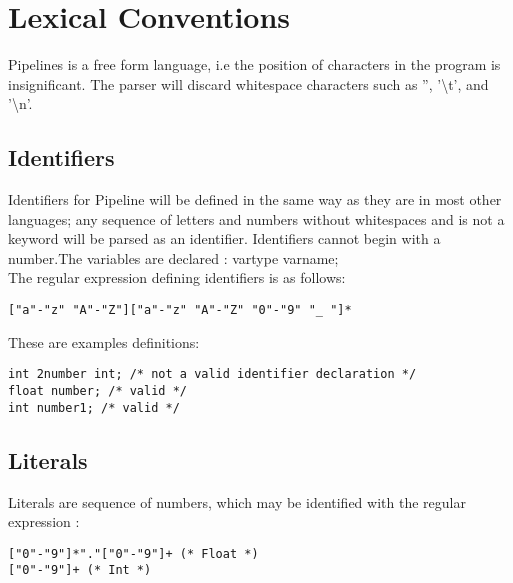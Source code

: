\documentclass[./LRM_main.tex]{subfiles}
\begin{document}


\chapter{Lexical Conventions}

Pipelines is a free form language, i.e the position of characters in the program is insignificant. The parser will discard whitespace characters such as '', '\textbackslash t', and '\textbackslash n'. 

\section{Identifiers}
Identifiers for Pipeline will be defined in the same way as they are in most other languages; any sequence of letters and numbers without whitespaces and is not a keyword will be parsed as an identifier. Identifiers cannot begin with a number.The variables are declared : vartype varname;  \\
The regular expression defining identifiers is as follows:  

\begin{lstlisting}
["a"-"z" "A"-"Z"]["a"-"z" "A"-"Z" "0"-"9" "_ "]*
\end{lstlisting}

These are examples definitions:

\begin{lstlisting}
int 2number int; /* not a valid identifier declaration */ 
float number; /* valid */ 
int number1; /* valid */
\end{lstlisting}

\section{Literals}
Literals are sequence of numbers, which may be identified with the regular expression : 
\begin{lstlisting}
["0"-"9"]*"."["0"-"9"]+ (* Float *)
["0"-"9"]+ (* Int *) 
\end{lstlisting}
\end{document}

